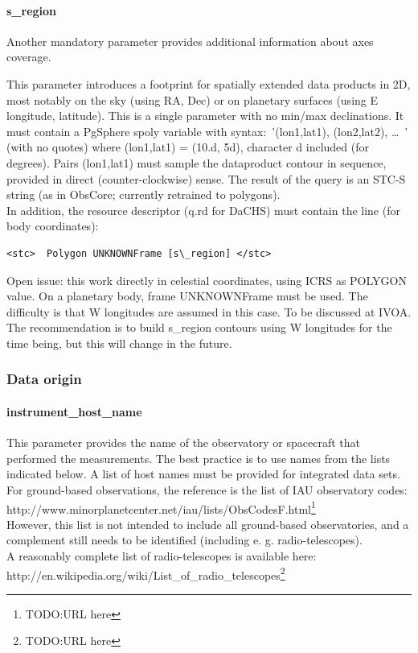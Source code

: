 \documentclass[11pt,a4paper]{ivoa}
\begin{document}
\paragraph{s\_region}

Another mandatory parameter provides additional information about axes coverage.

This parameter introduces a footprint for spatially extended data products in 2D, most notably on the sky (using RA, Dec) or on planetary surfaces (using E longitude, latitude). This is a single parameter with no min/max declinations. It must contain a PgSphere spoly variable with syntax: '{(lon1,lat1), (lon2,lat2), … }' (with no quotes) where (lon1,lat1) = (10.d, 5d), character d included (for degrees). Pairs (lon1,lat1) must sample the dataproduct contour in sequence, provided in direct (counter-clockwise) sense. The result of the query is an STC-S string (as in ObsCore; currently retrained to polygons).\\

In addition, the resource descriptor (q.rd for DaCHS) must contain the line (for body coordinates):






\begin{verbatim}<stc>  Polygon UNKNOWNFrame [s\_region] </stc>\end{verbatim}




Open issue: this work directly in celestial coordinates, using ICRS as POLYGON value. On a planetary body, frame UNKNOWNFrame must be used. The difficulty is that W longitudes are assumed in this case. To be discussed at IVOA. The recommendation is to build s\_region contours using W longitudes for the time being, but this will change in the future.

\subsubsection{Data origin}

\paragraph{instrument\_host\_name}

This parameter provides the name of the observatory or spacecraft that performed the measurements. The best practice is to use names from the lists indicated below. A list of host names must be provided for integrated data sets. \\ For ground-based observations, the reference is the list of IAU observatory codes: http://www.minorplanetcenter.net/iau/lists/ObsCodesF.html\footnote{TODO:URL here}\\ However, this list is not intended to include all ground-based observatories, and a complement still needs to be identified (including e. g. radio-telescopes).\\ A reasonably complete list of radio-telescopes is available here: \\ http://en.wikipedia.org/wiki/List\_of\_radio\_telescopes\footnote{TODO:URL here}
\end{document}
